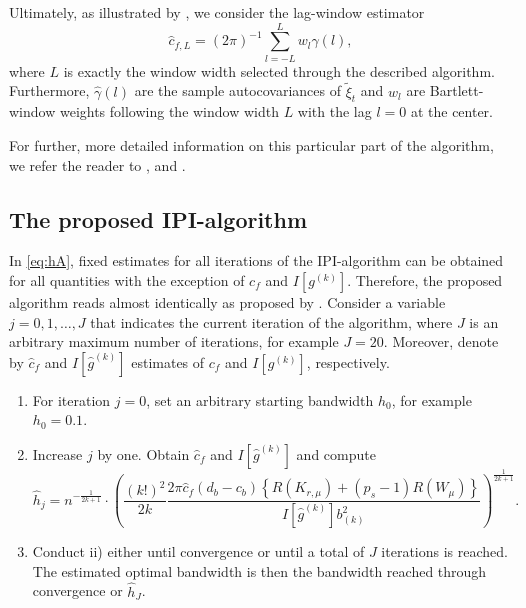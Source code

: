 \noindent
Ultimately, as illustrated by \citet{feng2020datadriven}, we consider the lag-window estimator
\begin{equation}
\hat c_{f,L}=(2\pi)^{-1}\sum_{l=-L}^{L} w_l \hat\gamma(l),
\label{eq:lagwindow}
\end{equation}
where \(L\) is exactly the window width selected through the described algorithm. Furthermore, \(\hat\gamma(l)\) are the sample autocovariances of \(\tilde{\xi}_t\) and \(w_l\) are Bartlett-window weights following the window width \(L\) with the lag \(l=0\) at the center.

For further, more detailed information on this particular part of the algorithm, we refer the reader to \citet{buhlmann1996locally}, \citet{feng2020datadriven} and \citet{feng2022smoots}.

\subsection{The proposed IPI-algorithm}\label{sec:IPI}

In \eqref{eq:hA}, fixed estimates for all iterations of the IPI-algorithm can be obtained for all quantities with the exception of \(c_f\) and \(I\left[g^{(k)} \right]\). Therefore, the proposed algorithm reads almost identically as proposed by \citet{feng2020datadriven}. Consider a variable \(j=0,1, \dots,J\) that indicates the current iteration of the algorithm, where \(J\) is an arbitrary maximum number of iterations, for example \(J = 20\). Moreover, denote by \(\hat c_f\) and \(I\left[\hat g^{(k)} \right]\) estimates of \(c_f\) and \(I\left[g^{(k)} \right]\), respectively.

\begin{enumerate}
\def\labelenumi{\roman{enumi})}
\item
  For iteration \(j=0\), set an arbitrary starting bandwidth \(h_0\), for example \(h_0 = 0.1\).
\item
  Increase \(j\) by one. Obtain \(\hat c_f\) and \(I\left[ \hat g^{(k)} \right]\) and compute\begin{equation*}\hat h_j = n^{-\frac{1}{2k+1}} \cdot \left( \frac{(k!)^2}{2k} \frac{2\pi \hat c_f (d_b - c_b) \left\{ R\left(K_{r,\mu}\right) + (p_s - 1)R(W_{\mu}) \right\}}{I\left[\hat g^{(k)} \right] b_{(k)}^2} \right)^{\frac{1}{2k+1}}.\end{equation*}
\item
  Conduct ii) either until convergence or until a total of \(J\) iterations is reached. The estimated optimal bandwidth is then the bandwidth reached through convergence or \(\hat h_{J}\).
\end{enumerate}

